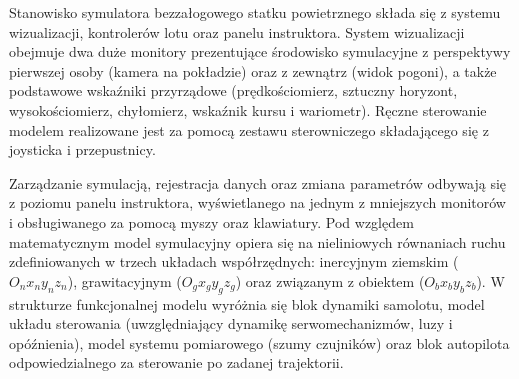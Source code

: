 \akapit Stanowisko symulatora bezzałogowego statku powietrznego składa się z systemu wizualizacji, kontrolerów lotu oraz panelu instruktora. System wizualizacji obejmuje dwa duże monitory prezentujące środowisko symulacyjne z perspektywy pierwszej osoby (kamera na pokładzie) oraz z zewnątrz (widok pogoni), a także podstawowe wskaźniki przyrządowe (prędkościomierz, sztuczny horyzont, wysokościomierz, chyłomierz, wskaźnik kursu i wariometr). Ręczne sterowanie modelem realizowane jest za pomocą zestawu sterowniczego składającego się z joysticka i przepustnicy.

\akapit Zarządzanie symulacją, rejestracja danych oraz zmiana parametrów odbywają się z poziomu panelu instruktora, wyświetlanego na jednym z mniejszych monitorów i obsługiwanego za pomocą myszy oraz klawiatury. Pod względem matematycznym model symulacyjny opiera się na nieliniowych równaniach ruchu zdefiniowanych w trzech układach współrzędnych: inercyjnym ziemskim ($O_n x_n y_n z_n$), grawitacyjnym ($O_g x_g y_g z_g$) oraz związanym z obiektem ($O_b x_b y_b z_b$). W strukturze funkcjonalnej modelu wyróżnia się blok dynamiki samolotu, model układu sterowania (uwzględniający dynamikę serwomechanizmów, luzy i opóźnienia), model systemu pomiarowego (szumy czujników) oraz blok autopilota odpowiedzialnego za sterowanie po zadanej trajektorii.
